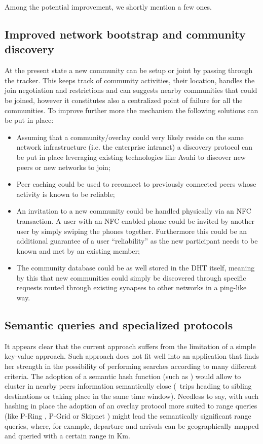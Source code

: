 Among the potential improvement, we shortly mention a few ones.
%
\subsection{Improved network bootstrap and community discovery}
%
At the present state a new community can be setup or joint by passing
through the tracker. This keeps track of community activities, their
location, handles the join negotiation and restrictions and can
suggests nearby communities that could be joined, however it
constitutes also a centralized point of failure for all the
communities. To improve further more the mechanism the following
solutions can be put in place:
%
\begin{itemize}
\item Assuming that a community/overlay could very likely reside on
  the same network infrastructure (i.e. the enterprise intranet) a
  discovery protocol can be put in place leveraging existing
  technologies like Avahi \cite{avahi:website} to discover new peers
  or new networks to join;

\item Peer caching could be used to reconnect to previously connected
  peers whose activity is known to be reliable;

\item An invitation to a new community could be handled physically via
  an NFC transaction. A user with an NFC enabled phone could be
  invited by another user by simply swiping the phones
  together. Furthermore this could be an additional guarantee of a
  user ``reliability'' as the new participant needs to be known and
  met by an existing member;

\item The community database could be as well stored in the DHT
  itself, meaning by this that new communities could simply be
  discovered through specific requests routed through existing
  synapses to other networks in a ping-like way.
\end{itemize}


\subsection{Semantic queries and specialized protocols}\label{sec:semantic}
%
It appears clear that the current approach suffers from the limitation
of a simple key-value approach. Such approach does not fit well into
an application that finds her strength in the possibility of
performing searches according to many different criteria.  The
adoption of a semantic hash function (such as \cite{SemanticHash})
would allow to cluster in nearby peers information semantically close
(\ie\ trips heading to sibling destinations or taking place in the
same time window).  Needless to say, with such hashing in place the
adoption of an overlay protocol more suited to range queries (like
P-Ring \cite{P-Ring}, P-Grid\cite{P-Grid} or Skipnet
\cite{Harvey03skipnet:a}) might lead the semantically significant
range queries, where, for example, departure and arrivals can be
geographically mapped and queried with a certain range in Km.


